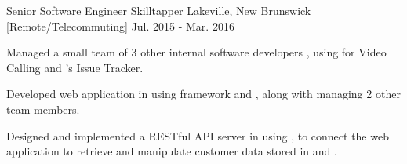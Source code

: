 

\begin{cventries}


  \cventry
    {Senior Software Engineer} %
    {Skilltapper} %
    {Lakeville, New Brunswick [Remote/Telecommuting]} %
    {Jul. 2015 - Mar. 2016} %
    {
      \begin{cvitems} %
        \item {Managed a small team of 3 other internal software developers , using  for Video Calling and 's Issue Tracker.}
        \item {Developed web application in  using  framework and , along with managing 2 other team members.}
        \item {Designed and implemented a RESTful API server in  using , to connect the web application to retrieve and manipulate customer data stored in  and .}
      \end{cvitems}
    }


\end{cventries}
